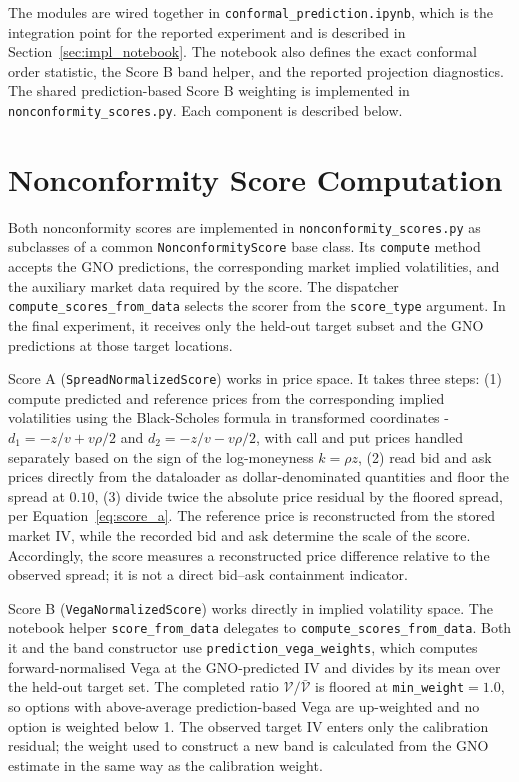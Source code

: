 The modules are wired together in \texttt{conformal\_prediction.ipynb}, which is the integration point for the reported experiment and is described in Section~\ref{sec:impl_notebook}. The notebook also defines the exact conformal order statistic, the Score B band helper, and the reported projection diagnostics. The shared prediction-based Score B weighting is implemented in \texttt{nonconformity\_scores.py}. Each component is described below.

\section{Nonconformity Score Computation}
\label{sec:impl_scores}

Both nonconformity scores are implemented in \texttt{nonconformity\_scores.py} as subclasses of a common \texttt{NonconformityScore} base class. Its \texttt{compute} method accepts the GNO predictions, the corresponding market implied volatilities, and the auxiliary market data required by the score. The dispatcher \texttt{compute\_scores\_from\_data} selects the scorer from the \texttt{score\_type} argument. In the final experiment, it receives only the held-out target subset and the GNO predictions at those target locations.

Score A (\texttt{SpreadNormalizedScore}) works in price space. It takes three steps: (1) compute predicted and reference prices from the corresponding implied volatilities using the Black-Scholes formula in transformed coordinates - $d_1 = -z/v + v\rho/2$ and $d_2 = -z/v - v\rho/2$, with call and put prices handled separately based on the sign of the log-moneyness $k = \rho z$, (2) read bid and ask prices directly from the dataloader as dollar-denominated quantities and floor the spread at $0.10$, (3) divide twice the absolute price residual by the floored spread, per Equation~\ref{eq:score_a}. The reference price is reconstructed from the stored market IV, while the recorded bid and ask determine the scale of the score. Accordingly, the score measures a reconstructed price difference relative to the observed spread; it is not a direct bid--ask containment indicator.

Score B (\texttt{VegaNormalizedScore}) works directly in implied volatility space. The notebook helper \texttt{score\_from\_data} delegates to \texttt{compute\_scores\_from\_data}. Both it and the band constructor use \texttt{prediction\_vega\_weights}, which computes forward-normalised Vega at the GNO-predicted IV and divides by its mean over the held-out target set. The completed ratio $\mathcal{V}/\bar{\mathcal{V}}$ is floored at \texttt{min\_weight}$=1.0$, so options with above-average prediction-based Vega are up-weighted and no option is weighted below 1. The observed target IV enters only the calibration residual; the weight used to construct a new band is calculated from the GNO estimate in the same way as the calibration weight.

